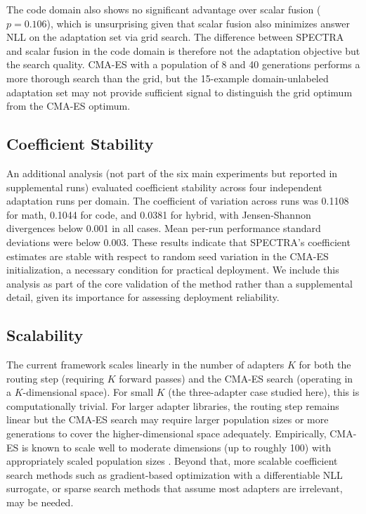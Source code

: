 \documentclass[preprint,12pt]{elsarticle}
\begin{document}
The code domain also shows no significant advantage over scalar fusion
($p = 0.106$), which is unsurprising given that scalar fusion also minimizes
answer NLL on the adaptation set via grid search. The difference between
SPECTRA and scalar fusion in the code domain is therefore not the adaptation
objective but the search quality. CMA-ES with a population of 8 and 40
generations performs a more thorough search than the grid, but the 15-example
domain-unlabeled adaptation set may not provide sufficient signal to distinguish
the grid optimum from the CMA-ES optimum.

\subsection{Coefficient Stability}

An additional analysis (not part of the six main experiments but reported in
supplemental runs) evaluated coefficient stability across four independent
adaptation runs per domain. The coefficient of variation across runs was
0.1108 for math, 0.1044 for code, and 0.0381 for hybrid, with Jensen-Shannon
divergences below 0.001 in all cases. Mean per-run performance standard
deviations were below 0.003. These results indicate that SPECTRA's coefficient
estimates are stable with respect to random seed variation in the CMA-ES
initialization, a necessary condition for practical deployment. We include this
analysis as part of the core validation of the method rather than a supplemental
detail, given its importance for assessing deployment reliability.

\subsection{Scalability}

The current framework scales linearly in the number of adapters $K$ for both
the routing step (requiring $K$ forward passes) and the CMA-ES search (operating
in a $K$-dimensional space). For small $K$ (the three-adapter case studied here),
this is computationally trivial. For larger adapter libraries, the routing step
remains linear but the CMA-ES search may require larger population sizes or more
generations to cover the higher-dimensional space adequately. Empirically,
CMA-ES is known to scale well to moderate dimensions (up to roughly 100) with
appropriately scaled population sizes \cite{hansen2016cmaes}. Beyond that, more
scalable coefficient search methods such as gradient-based optimization with a
differentiable NLL surrogate, or sparse search methods that assume most adapters
are irrelevant, may be needed.
\end{document}
